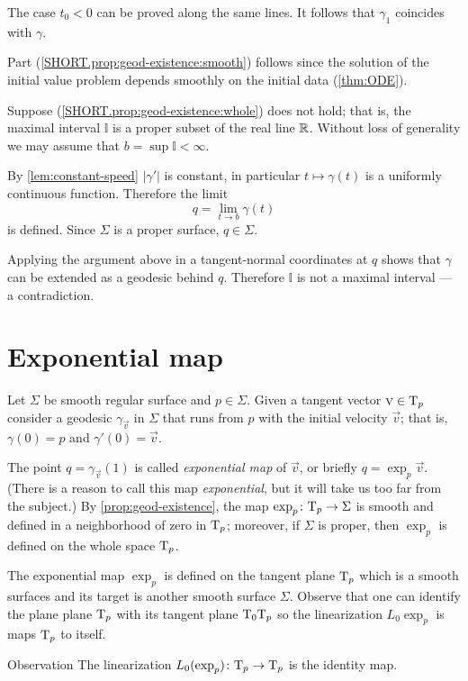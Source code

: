The case $t_0<0$ can be proved along the same lines.
It follows that $\gamma_1$ coincides with $\gamma$.

Part (\ref{SHORT.prop:geod-existence:smooth}) follows since the solution of the initial value problem depends smoothly on the initial data (\ref{thm:ODE}).

Suppose (\ref{SHORT.prop:geod-existence:whole}) does not hold;
that is, the maximal interval $\mathbb{I}$ is a proper subset of the real line $\mathbb{R}$.
Without loss of generality we may assume that $b=\sup\mathbb{I}<\infty$.

By \ref{lem:constant-speed} $|\gamma'|$ is constant, in particular $t\mapsto \gamma(t)$ is a uniformly continuous function.
Therefore  the limit 
\[q=\lim_{t\to b}\gamma(t)\] 
is defined.
Since $\Sigma$ is a proper surface, $q\in \Sigma$. 

Applying the argument above in a tangent-normal coordinates at $q$ shows that $\gamma$ can be extended as a geodesic behind $q$.
Therefore $\mathbb{I}$ is not a maximal interval --- a contradiction.
\qeds




\section*{Exponential map}\label{sec:exp}

Let $\Sigma$ be smooth regular surface and $p\in \Sigma$.
Given a tangent vector ${\textsc v}\in \mathrm{T}_p$ consider a geodesic $\gamma_{\vec v}$ in $\Sigma$ that runs from $p$ with the initial velocity ${\vec v}$;  
that is, $\gamma(0)=p$ and $\gamma'(0)={\vec v}$.

The point $q=\gamma_{\vec v}(1)$ is called \emph{exponential map} of ${\vec v}$, or briefly $q=\exp_p{\vec v}$.
(There is a reason to call this map \emph{exponential}, but it will take us too far from the subject.)
By \ref{prop:geod-existence}, the map $\exp_p\colon\mathrm{T}_p\to \Sigma$ is smooth and defined in a neighborhood of zero in $\mathrm{T}_p$;
moreover, if $\Sigma$ is proper, then $\exp_p$ is defined on the whole space $\mathrm{T}_p$.

The exponential map $\exp_p$ 
is defined on the tangent plane $\mathrm{T}_p$ which is a smooth surfaces
and its target is another smooth surface $\Sigma$.
Observe that one can identify the plane plane $\mathrm{T}_p$
with its tangent plane $\mathrm{T}_0\mathrm{T}_p$ so the linearization $L_0\exp_p$ is maps $\mathrm{T}_p$ to itself.

\begin{thm}{Observation}
The linearization $L_0(\exp_p)\colon\mathrm{T}_p\to \mathrm{T}_p$ is the identity map.
\end{thm}


